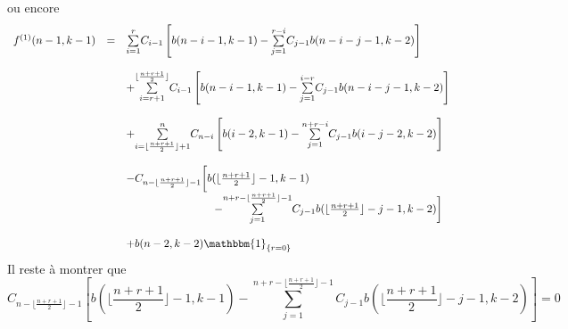 ou encore
\[
	\begin{array} {l l l}
		f^{(1)}(n-1,k-1) & =        & \underset{i=1}{\overset{r}{\sum}}C_{i-1}\left[b(n-i-1,k-1)-\underset{j=1}{\overset{r-i}{\sum}}C_{j-1}b(n-i-j-1,k-2)\right]                                 \\
		                 & \text{ } &                                                                                                                                                            \\
		                 & \text{}  & +\underset{i=r+1}{\overset{\lfloor \frac{n+r+1}{2}\rfloor}{\sum}}C_{i-1}\left[b(n-i-1,k-1)-\underset{j=1}{\overset{i-r}{\sum}}C_{j-1}b(n-i-j-1,k-2)\right] \\
		                 & \text{ } &                                                                                                                                                            \\
		                 & \text{}  & +\underset{i=\lfloor \frac{n+r+1}{2}\rfloor+1}{\overset{n}{\sum}}C_{n-i}\left[b(i-2,k-1)-\underset{j=1}{\overset{n+r-i}{\sum}}C_{j-1}b(i-j-2,k-2)\right]   \\
		                 & \text{ } &                                                                                                                                                            \\
		                 & \text{}  & -C_{n-\lfloor \frac{n+r+1}{2} \rfloor-1}\biggl[ b( \lfloor \frac{n+r+1}{2} \rfloor -1 , k-1)                                                               \\
		                 & \text{}  & \hspace{80pt} -\underset{j=1}{\overset{n+r-\lfloor \frac{n+r+1}{2} \rfloor-1}{\sum}}C_{j-1}b(\lfloor \frac{n+r+1}{2} \rfloor-j-1,k-2) \biggr]              \\
		                 & \text{ } &                                                                                                                                                            \\
		                 & \text{}  & +b(n-2,k-2)\mathbbm{1}_{\{r = 0\}}
	\end{array}
\]
Il reste à montrer que \\
$$C_{n-\lfloor \frac{n+r+1}{2} \rfloor-1}\left[ b( \lfloor \frac{n+r+1}{2} \rfloor -1 , k-1)  -\underset{j=1}{\overset{n+r-\lfloor \frac{n+r+1}{2} \rfloor-1}{\sum}}C_{j-1}b(\lfloor \frac{n+r+1}{2} \rfloor-j-1,k-2) \right] = 0$$
